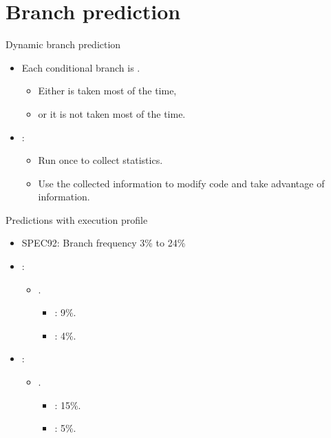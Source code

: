 \section{Branch prediction}

\begin{frame}[t]{Dynamic branch prediction}
\begin{itemize}
  \item Each conditional branch is .
    \begin{itemize}
      \item Either is taken most of the time,
      \item or it is not taken most of the time.
    \end{itemize}

  \item {}:
    \begin{itemize}
      \item Run once to collect statistics.
      \item Use the collected information to modify code and take advantage of information.
    \end{itemize}
\end{itemize}
\end{frame}

\begin{frame}[t]{Predictions with execution profile}
\begin{itemize}
  \item SPEC92: Branch frequency 3\% to 24\%
  \item {}:
    \begin{itemize}
      \item {}. 
        \begin{itemize}
          \item {}: 9\%. 
          \item {}: 4\%.
        \end{itemize}
    \end{itemize}
  \item {}:
    \begin{itemize}
      \item {}. 
        \begin{itemize}
          \item {}: 15\%. 
          \item {}: 5\%.
        \end{itemize}
    \end{itemize}
\end{itemize}
\end{frame}

